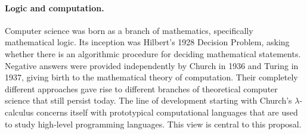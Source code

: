 \documentclass[11pt,twocolumn]{article}
\newcommand{\hide}[1]{}
\newcommand{\pref}[1]{\,(\ref{#1})}
\newcommand{\lcalculus}{\mbox{$\lambda$-calculus}}
\begin{document}
\paragraph{Logic and computation.}

Computer science was born as a branch of mathematics, specifically
mathematical logic. %
Its inception %
was Hilbert's %
1928 Decision Problem, %
asking whether there is an algorithmic procedure for deciding mathematical
statements.  Negative answers were provided independently by
Church %
in 1936 and 
Turing %
in 1937,
giving birth to the mathematical theory of computation.  Their completely
different approaches gave rise to different branches of theoretical
computer science that still persist today.  
The %
line
of development starting with Church's {\lcalculus} %
concerns itself with prototypical computational languages that are
used to study high-level programming languages.  
%
This %
view is central to this proposal.  
\hide{
The {\lcalculus} is a
deceptively simple formal system.  Its syntax consists of three types of
phrases: variables, applications, and abstraction.  Church's seminal
innovation was in introducing the latter one, 
which in modern terminology is referred to as a binding operator, a notion
that goes beyond the operators of universal algebra. %
Binding operators are an integral part of all high-level programming
languages.  
}

\end{document}
